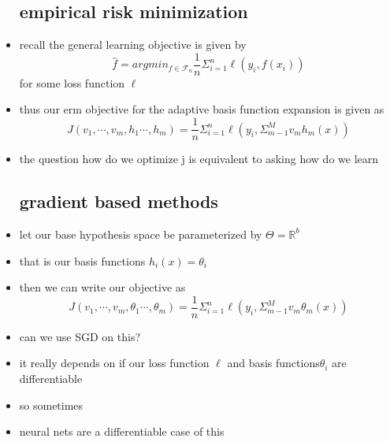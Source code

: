 \documentclass{article}
\begin{document}
\begin{itemize}
\subsection{empirical risk minimization }
\item recall the general learning objective is given by $$\hat{f}=argmin_{f\in \mathcal{F}_{n}}\frac{1}{n}\Sigma_{i=1}^{n}\ell(y_i,f(x_i))$$ for some loss function $\ell$
\item thus our erm objective for the adaptive basis function expansion is given as $$J(v_1,\cdots, v_m, h_1\cdots , h_m)=\frac{1}{n}\Sigma_{i=1}^{n}\ell(y_i,\Sigma_{m-1}^{M}v_mh_m(x))$$ 
\item the question  how do we optimize j is equivalent to asking how do we learn 
\subsection{gradient based methods}
\item let our base hypothesis space be parameterized by $\Theta=\mathbb{R}^{b}$
\item that is our basis functions $h_{i}(x)=\theta_i$
\item then we can write our objective as$$J(v_1,\cdots, v_m, \theta_1\cdots , \theta_m)=\frac{1}{n}\Sigma_{i=1}^{n}\ell(y_i,\Sigma_{m-1}^{M}v_m\theta_m(x))$$  
\item can we use SGD on this? 
\item it really depends on if our loss function $\ell$ and basis functions$\theta_{i}$ are differentiable 
\item so sometimes
\item neural nets are a differentiable case of this

\end{itemize}
\end{document}

